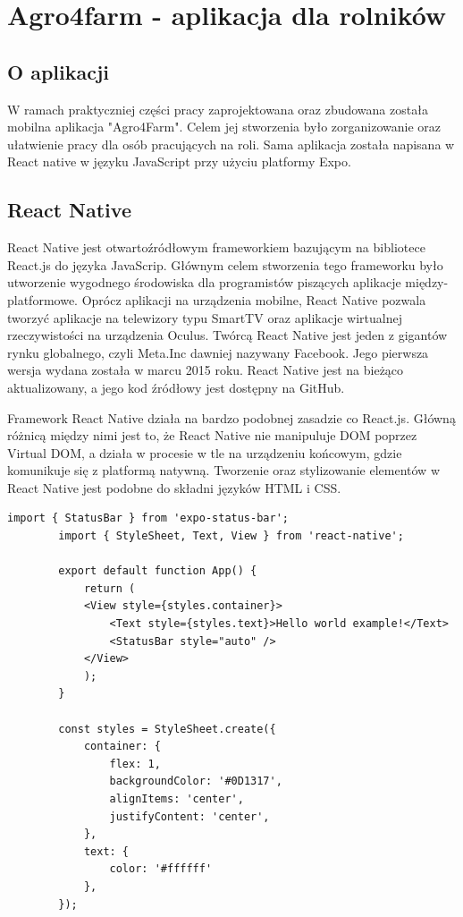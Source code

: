 \documentclass[a4paper,12pt,oneside]{book}
\begin{document}
	\newpage
	\chapter{Agro4farm - aplikacja dla rolników}
	
	\section{O aplikacji}
	W ramach praktyczniej części pracy zaprojektowana oraz zbudowana została mobilna aplikacja "Agro4Farm". Celem jej stworzenia było zorganizowanie oraz ułatwienie pracy dla osób pracujących na roli. Sama aplikacja została napisana w React native w języku JavaScript przy użyciu platformy Expo.
	
	\section{React Native}	
	React Native jest otwartoźródłowym frameworkiem bazującym na bibliotece React.js do języka JavaScrip. Głównym celem stworzenia tego frameworku było utworzenie wygodnego środowiska dla programistów piszących aplikacje między-platformowe. Oprócz aplikacji na urządzenia mobilne, React Native pozwala tworzyć aplikacje na telewizory typu SmartTV oraz aplikacje wirtualnej rzeczywistości na urządzenia Oculus. Twórcą React Native jest jeden z gigantów rynku globalnego, czyli Meta.Inc dawniej nazywany Facebook. Jego pierwsza wersja wydana została w marcu 2015 roku. React Native jest na bieżąco aktualizowany, a jego kod źródłowy jest dostępny na GitHub.
	
	\newpage
	
	Framework React Native działa na bardzo podobnej zasadzie co React.js. Główną różnicą między nimi jest to, że React Native nie manipuluje DOM poprzez Virtual DOM, a działa w procesie w tle na urządzeniu końcowym, gdzie komunikuje się z platformą natywną. Tworzenie oraz stylizowanie elementów w React Native jest podobne do składni języków HTML i CSS.
	
	\begin{lstlisting}[caption=Kod przykłądowej aplikacji "Hello world" w React Native]
		import { StatusBar } from 'expo-status-bar';
		import { StyleSheet, Text, View } from 'react-native';
		
		export default function App() {
			return (
			<View style={styles.container}>
				<Text style={styles.text}>Hello world example!</Text>
				<StatusBar style="auto" />
			</View>
			);
		}
		
		const styles = StyleSheet.create({
			container: {
				flex: 1,
				backgroundColor: '#0D1317',
				alignItems: 'center',
				justifyContent: 'center',
			},
			text: {
				color: '#ffffff'
			},
		});
	\end{lstlisting}
\end{document}
